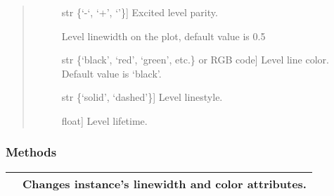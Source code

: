 \documentclass[letterpaper,10pt,english]{sphinxmanual}
\begin{document}
\begin{fulllineitems}
\begin{quote}
\begin{description}
\begin{description}
\item[{}] \leavevmode{[}str \{‘-‘, ‘+’, ‘’\}{]}
Excited level parity.

\item[{}] \leavevmode
Level linewidth on the plot, default value is 0.5

\item[{}] \leavevmode{[}str \{‘black’, ‘red’, ‘green’, etc.\} or RGB code{]}
Level line color. Default value is ‘black’.

\item[{}] \leavevmode{[}str \{‘solid’, ‘dashed’\}{]}
Level linestyle.

\item[{}] \leavevmode{[}float{]}
Level lifetime.

\end{description}

\end{description}\end{quote}
\subsubsection*{Methods}


\begin{savenotes}\sphinxattablestart
\centering
\begin{tabulary}{\linewidth}[t]{|T|T|}
\hline

&
Changes instance’s linewidth and color attributes.
\\
\hline
\end{tabulary}
\par
\sphinxattableend\end{savenotes}

\end{fulllineitems}

\end{document}
